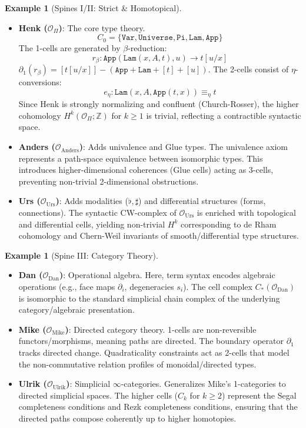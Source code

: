 \documentclass{article}
\theoremstyle{definition}
\newtheorem{example}[definition]{Example}
\theoremstyle{plain}
\begin{document}
\begin{example}[Spines I/II: Strict \& Homotopical]
\end{example}
\begin{itemize}
    \item \textbf{Henk
    ($\mathcal{O}_\Pi$)}: The core type theory.
    \[ C_0 = \{ \mathtt{Var}, \mathtt{Universe}, \mathtt{Pi}, \mathtt{Lam}, \mathtt{App} \} \]
    The 1-cells are generated by $\beta$-reduction:
    \[ r_\beta : \mathtt{App}(\mathtt{Lam}(x, A, t), u) \to t[u/x] \]
    $\partial_1(r_\beta) = [t[u/x]] - ( \mathtt{App} + \mathtt{Lam} + [t] + [u] )$.
    The 2-cells consist of $\eta$-conversions:
    \[ e_\eta : \mathtt{Lam}(x, A, \mathtt{App}(t, x)) \equiv_\eta t \]
    Since Henk is strongly normalizing and confluent (Church-Rosser), the higher cohomology $H^k(\mathcal{O}_\Pi; \mathbb{Z})$ for $k \geq 1$ is trivial, reflecting a contractible syntactic space.
    \item \textbf{Anders
    ($\mathcal{O}_{\mathrm{Anders}}$)}: Adds univalence and Glue types. The univalence axiom represents a path-space equivalence between isomorphic types. This introduces higher-dimensional coherences (Glue cells) acting as 3-cells, preventing non-trivial 2-dimensional obstructions.
    \item \textbf{Urs
    ($\mathcal{O}_{\mathrm{Urs}}$)}: Adds modalities ($\flat, \sharp$) and differential structures (forms, connections). The syntactic CW-complex of $\mathcal{O}_{\mathrm{Urs}}$ is enriched with topological and differential cells, yielding non-trivial $H^k$ corresponding to de Rham cohomology and Chern-Weil invariants of smooth/differential type structures.
\end{itemize}

\begin{example}[Spine III: Category Theory]
\end{example}
\begin{itemize}
    \item \textbf{Dan
    ($\mathcal{O}_{\mathrm{Dan}}$)}: Operational algebra. Here, term syntax encodes algebraic operations (e.g., face maps $\partial_i$, degeneracies $s_i$). The cell complex $C_*(\mathcal{O}_{\mathrm{Dan}})$ is isomorphic to the standard simplicial chain complex of the underlying category/algebraic presentation.
    \item \textbf{Mike
    ($\mathcal{O}_{\mathrm{Mike}}$)}: Directed category theory. 1-cells are non-reversible functors/morphisms, meaning paths are directed. The boundary operator $\partial_1$ tracks directed change. Quadraticality constraints act as 2-cells that model the non-commutative relation profiles of monoidal/directed types.
    \item \textbf{Ulrik
    ($\mathcal{O}_{\mathrm{Ulrik}}$)}: Simplicial $\infty$-categories. Generalizes Mike's 1-categories to directed simplicial spaces. The higher cells ($C_k$ for $k \geq 2$) represent the Segal completeness conditions and Rezk completeness conditions, ensuring that the directed paths compose coherently up to higher homotopies.
\end{itemize}
\end{document}
